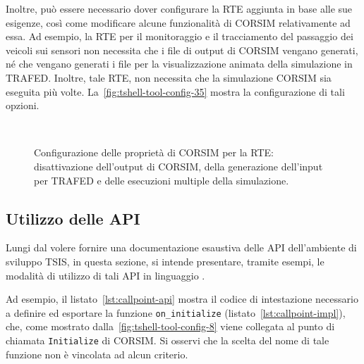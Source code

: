 Inoltre, può essere necessario dover configurare la \acs{RTE} aggiunta in base alle sue esigenze, così come modificare alcune funzionalità di \acs{CORSIM} relativamente ad essa. Ad esempio, la \acs{RTE} per il monitoraggio e il tracciamento del passaggio dei veicoli sui sensori non necessita che i file di output di \acs{CORSIM} vengano generati, né che vengano generati i file per la visualizzazione animata della simulazione in \acs{TRAFED}. Inoltre, tale \acs{RTE}, non necessita che la simulazione \acs{CORSIM} sia eseguita più volte. La~\vref{fig:tshell-tool-config-35} mostra la configurazione di tali opzioni.
\begin{figure}[H]
    \centering
     \\
    \caption[Configurazione delle proprietà di \acs{CORSIM}]{Configurazione delle proprietà di \acs{CORSIM} per la \acs{RTE}: disattivazione dell'output di \acs{CORSIM}, della generazione dell'input per \acs{TRAFED} e delle esecuzioni multiple della simulazione.}
    \label{fig:tshell-tool-config-35}
\end{figure}

\cleardoublepage
\subsection{Utilizzo delle API}\label{subsec:tsis-api-examples}
Lungi dal volere fornire una documentazione esaustiva delle \acs{API} dell'ambiente di sviluppo \acs{TSIS}, in questa sezione, si intende presentare, tramite esempi, le modalità di utilizzo di tali \acs{API} in linguaggio \CC{}.

Ad esempio, il listato~\ref{lst:callpoint-api} mostra il codice di intestazione necessario a definire ed esportare la funzione \lstinline[]|on_initialize| (listato~\ref{lst:callpoint-impl}), che, come mostrato dalla~\vref{fig:tshell-tool-config-8} viene collegata al punto di chiamata \lstinline[]|Initialize| di \acs{CORSIM}. Si osservi che la scelta del nome di tale funzione non è vincolata ad alcun criterio.

\vspace*{8pt}



